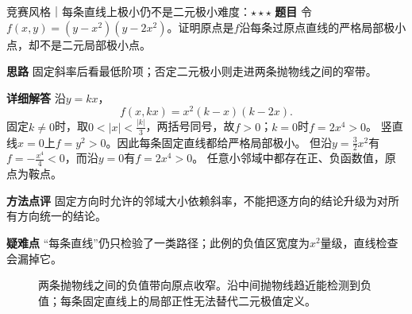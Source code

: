 \begin{example}{竞赛风格｜每条直线上极小仍不是二元极小}{难度：$\star\star\star$}
\label{cmv:ex:paraboliccorridor}
\textbf{题目} 令$f(x,y)=(y-x^2)(y-2x^2)$。证明原点是$f$沿每条过原点直线的严格局部极小点，却不是二元局部极小点。\par
\textbf{思路} 固定斜率后看最低阶项；否定二元极小则走进两条抛物线之间的窄带。\par
\textbf{详细解答} 沿$y=kx$，
\[
f(x,kx)=x^2(k-x)(k-2x).
\]
固定$k\ne0$时，取$0<|x|<\frac{|k|}{3}$，两括号同号，故$f>0$；$k=0$时$f=2x^4>0$。
竖直线$x=0$上$f=y^2>0$。因此每条固定直线都给严格局部极小。
但沿$y=\frac32x^2$有$f=-\frac{x^4}{4}<0$，而沿$y=0$有$f=2x^4>0$。
任意小邻域中都存在正、负函数值，原点为鞍点。\par
\textbf{方法点评} 固定方向时允许的邻域大小依赖斜率，不能把逐方向的结论升级为对所有方向统一的结论。\par
\textbf{疑难点} “每条直线”仍只检验了一类路径；此例的负值区宽度为$x^2$量级，直线检查会漏掉它。
\end{example}
\begin{figure}[htbp]\centering
{}
\caption{两条抛物线之间的负值带向原点收窄。沿中间抛物线趋近能检测到负值；每条固定直线上的局部正性无法替代二元极值定义。}
\label{cmv:fig:corridor}
\end{figure}
